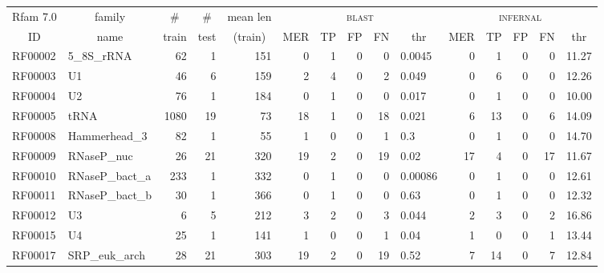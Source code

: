 

\renewcommand{\baselinestretch}{1.0}
\begin{table}
\scriptsize
\begin{center}
\begin{tabular}{|ll|rrr|rrrrl|rrrrr|} \hline
\multicolumn{1}{|c}{Rfam 7.0} & \multicolumn{1}{c|}{family} & \multicolumn{1}{c}{\#} & \multicolumn{1}{c}{\#} & \multicolumn{1}{c}{mean len} & \multicolumn{5}{|c|}{\textsc{blast}} & \multicolumn{5}{|c|}{\textsc{infernal}} \\ 
\multicolumn{1}{|c}{ID} & \multicolumn{1}{c|}{name} & \multicolumn{1}{c}{train} & \multicolumn{1}{c}{test} & \multicolumn{1}{c|}{(train)} & \multicolumn{1}{c}{MER} & \multicolumn{1}{c}{TP} & \multicolumn{1}{c}{FP} & \multicolumn{1}{c}{FN} & \multicolumn{1}{c|}{thr} & \multicolumn{1}{c}{MER} & \multicolumn{1}{c}{TP} & \multicolumn{1}{c}{FP} & \multicolumn{1}{c}{FN} & \multicolumn{1}{c|}{thr} \\ \hline 
RF00002 & 5\_8S\_rRNA & 62 & 1 & 151 & 0 & 1 & 0 & 0 & 0.0045 & 0 & 1 & 0 & 0 &  11.27 \\  
RF00003 & U1 & 46 & 6 & 159 & 2 & 4 & 0 & 2 &  0.049 & 0 & 6 & 0 & 0 &  12.26 \\  
RF00004 & U2 & 76 & 1 & 184 & 0 & 1 & 0 & 0 &  0.017 & 0 & 1 & 0 & 0 &     10.00 \\  
RF00005 & tRNA & 1080 & 19 & 73 & 18 & 1 & 0 & 18 &  0.021 & 6 & 13 & 0 & 6 &  14.09 \\  
RF00008 & Hammerhead\_3 & 82 & 1 & 55 & 1 & 0 & 0 & 1 &    0.3 & 0 & 1 & 0 & 0 &   14.70 \\  
RF00009 & RNaseP\_nuc & 26 & 21 & 320 & 19 & 2 & 0 & 19 &   0.02 & 17 & 4 & 0 & 17 &  11.67 \\  
RF00010 & RNaseP\_bact\_a & 233 & 1 & 332 & 0 & 1 & 0 & 0 & 0.00086 & 0 & 1 & 0 & 0 &  12.61 \\  
RF00011 & RNaseP\_bact\_b & 30 & 1 & 366 & 0 & 1 & 0 & 0 &   0.63 & 0 & 1 & 0 & 0 &  12.32 \\  
RF00012 & U3 & 6 & 5 & 212 & 3 & 2 & 0 & 3 &  0.044 & 2 & 3 & 0 & 2 &  16.86 \\  
RF00015 & U4 & 25 & 1 & 141 & 1 & 0 & 0 & 1 &   0.04 & 1 & 0 & 0 & 1 &  13.44 \\  
RF00017 & SRP\_euk\_arch & 28 & 21 & 303 & 19 & 2 & 0 & 19 &   0.52 & 7 & 14 & 0 & 7 &  12.84 \\  

\end{tabular}
\end{center}
\end{table}
